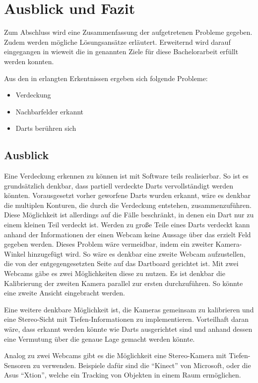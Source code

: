 \chapter{Ausblick und Fazit}
\label{chap:prospect}
Zum Abschluss wird eine Zusammenfassung der aufgetretenen Probleme gegeben. Zudem werden mögliche Lösungsansätze erläutert. Erweiternd wird darauf eingegangen in wieweit die in  genannten Ziele für diese Bachelorarbeit erfüllt werden konnten.

Aus den in  erlangten Erkentnissen ergeben sich folgende Probleme:
\begin{itemize}
	\item Verdeckung
	\item Nachbarfelder erkannt
	\item Darts berühren sich
\end{itemize}

\section*{Ausblick}
Eine Verdeckung erkennen zu können ist mit Software teils  realisierbar. So ist es grundsätzlich denkbar, dass partiell verdeckte Darts vervollständigt werden könnten. Vorausgesetzt vorher geworfene Darts wurden erkannt, wäre es denkbar die multiplen Konturen, die durch die Verdeckung entstehen, zusammenzuführen. Diese Möglichkeit ist allerdings auf die Fälle beschränkt, in denen ein Dart nur zu einem kleinen Teil verdeckt ist. Werden zu große Teile eines Darts verdeckt kann anhand der Informationen der einen Webcam keine Aussage über das erzielt Feld gegeben werden. 
Dieses Problem wäre vermeidbar, indem ein zweiter Kamera-Winkel hinzugefügt wird. 
So wäre es denkbar eine zweite Webcam aufzustellen, die von der entgegengesetzten Seite auf das Dartboard gerichtet ist. Mit zwei Webcams gäbe es zwei Möglichkeiten diese zu nutzen. 
Es ist denkbar die Kalibrierung der zweiten Kamera parallel zur ersten durchzuführen. So könnte eine zweite Ansicht eingebracht werden. 

Eine weitere denkbare Möglichkeit ist, die Kameras gemeinsam zu kalibrieren und eine Stereo-Sicht mit Tiefen-Informationen zu implementieren. Vorteilhaft daran wäre, dass erkannt werden könnte wie Darts ausgerichtet sind und anhand dessen eine Vermutung über die genaue Lage gemacht werden könnte.

Analog zu zwei Webcams gibt es die Möglichkeit eine Stereo-Kamera mit Tiefen-Sensoren zu verwenden. Beispiele dafür sind die "`Kinect"' von Microsoft, oder die Asus "`Xtion"', welche ein Tracking von Objekten in einem Raum ermöglichen.

